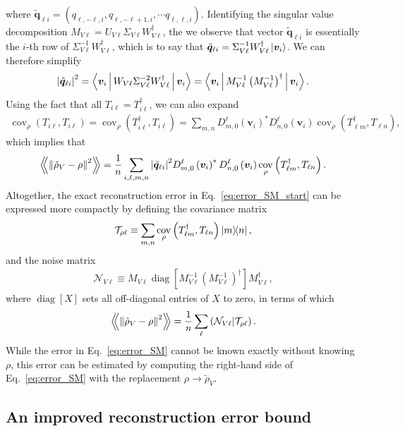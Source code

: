 \documentclass[notitlepage,twocolumn]{revtex4-2}
\newcommand{\f}[2]{\dfrac{#1}{#2}} %
\newcommand{\p}[1]{\left(#1\right)} %
\renewcommand{\sp}[1]{\left[#1\right]} %
\newcommand{\bk}{\Braket} %
\renewcommand{\v}{\bm} %
\newcommand{\Bbk}[1]
{\left\langle\!\!\left\langle #1 \right\rangle\!\!\right\rangle}
\newcommand{\N}{\mathcal{N}}
\newcommand{\T}{\mathcal{T}}
\def\obk#1{\mathinner{({#1})}}
\DeclareMathOperator{\cov}{cov}
\DeclareMathOperator{\diag}{diag}
\begin{document}
where $\tilde{\v q}_{\ell i} = (q_{\ell,-\ell,i},q_{\ell,-\ell+1,i},\cdots q_{\ell,\ell,i})$.
Identifying the singular value decomposition $M_{V\ell} = U_{V\ell} \Sigma_{V\ell} W_{V\ell}^\dag$, the we observe that vector $\tilde{\v q}_{\ell i}$ is essentially the $i$-th row of $\Sigma_{V\ell}^{-1} W_{V\ell}^\dag$, which is to say that $\tilde{\v q}_{\ell i} = \Sigma_{V\ell}^{-1} W_{V\ell}^\dag \ket{\v v_i}$.
We can therefore simplify
\begin{align}
  \abs{\tilde{\v q}_{\ell i}}^2
  = \bk{\v v_i | W_{V\ell} \Sigma_{V\ell}^{-2} W_{V\ell}^\dag | \v v_i}
  = \bk{\v v_i| M_{V\ell}^{-1} \p{M_{V\ell}^{-1}}^\dag | \v v_i}.
\end{align}
Using the fact that all $T_{i\ell}=T_{i\ell}^\dag$, we can also expand
\begin{align}
  \cov_\rho\p{T_{i\ell},T_{i\ell}}
  = \cov_\rho\p{T_{i\ell}^\dag,T_{i\ell}}
  = \sum_{m,n} D^\ell_{m,0}\p{\v v_i}^* D^\ell_{n,0}\p{\v v_i}
  \cov_\rho\p{T_{\ell m}^\dag, T_{\ell n}},
\end{align}
which implies that
\begin{align}
  \Bbk{\norm{\tilde\rho_V-\rho}^2}
  = \f1n \sum_{i,\ell,m,n}
  \abs{\tilde{\v q}_{\ell i}}^2
  D^\ell_{m,0}\p{\v v_i}^* D^\ell_{n,0}\p{\v v_i}
  \cov_\rho\p{T_{\ell m}^\dag, T_{\ell n}}.
\end{align}
Altogether, the exact reconstruction error in Eq.~\eqref{eq:error_SM_start} can be expressed more compactly by defining the covariance matrix
\begin{align}
  \T_{\rho\ell} \equiv
  \sum_{m,n} \cov_\rho\p{T_{\ell m}^\dag, T_{\ell n}} \op{m}{n},
\end{align}
and the noise matrix
\begin{align}
  \N_{V\ell} \equiv M_{V\ell} \diag\sp{M_{V\ell}^{-1}
    \p{M_{V\ell}^{-1}}^\dag} M_{V\ell}^\dag,
\end{align}
where $\diag\sp{X}$ sets all off-diagonal entries of $X$ to zero, in terms of which
\begin{align}
  \Bbk{\norm{\tilde\rho_V-\rho}^2}
  = \f1n \sum_\ell \obk{\N_{V\ell}|\T_{\rho\ell}}.
  \label{eq:error_SM}
\end{align}
While the error in Eq.~\eqref{eq:error_SM} cannot be known exactly without knowing $\rho$, this error can be estimated by computing the right-hand side of Eq.~\eqref{eq:error_SM} with the replacement $\rho\to\tilde\rho_V$.

\subsection{An improved reconstruction error bound}
\end{document}
